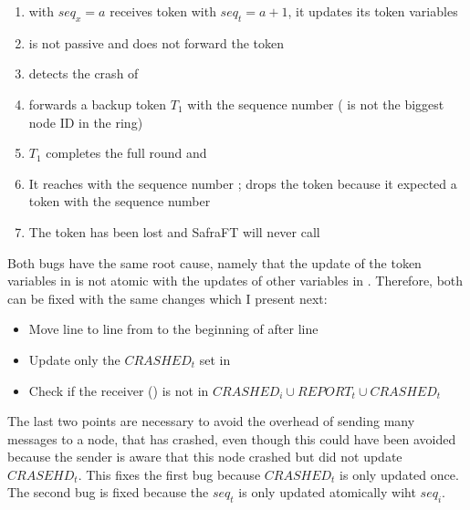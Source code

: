 \begin{enumerate}
    \item {} with $seq_x = a$ receives token  with $seq_t=a+1$, it updates its token variables
    \item {} is not passive and does not forward the token
    \item {} detects the crash of 
    \item {} forwards a backup token $T_1$ with the sequence number  ( is not the biggest node ID in the ring)
    \item $T_1$ completes the full round and
    \item It reaches  with the sequence number ;  drops the token because it expected a token with the sequence number 
    \item The token has been lost and SafraFT will never call 
\end{enumerate}

Both bugs have the same root cause, namely that the update of the token variables in  is not atomic with the updates of other variables in .
Therefore, both can be fixed with the same changes which I present next:
\begin{itemize}
    \item Move line to line from  to the beginning of  after line %
    \item Update only the $CRASHED_t$ set in 
    \item Check if the receiver () is not in $CRASHED_i \cup REPORT_t \cup CRASHED_t$
\end{itemize}

The last two points are necessary to avoid the overhead of sending many messages to a node, that has crashed, even though this could have been avoided because the sender is aware that this node crashed but did not update $CRASEHD_t$.
This fixes the first bug because $CRASHED_t$ is only updated once.
The second bug is fixed because the $seq_t$ is only updated atomically wiht $seq_i$.